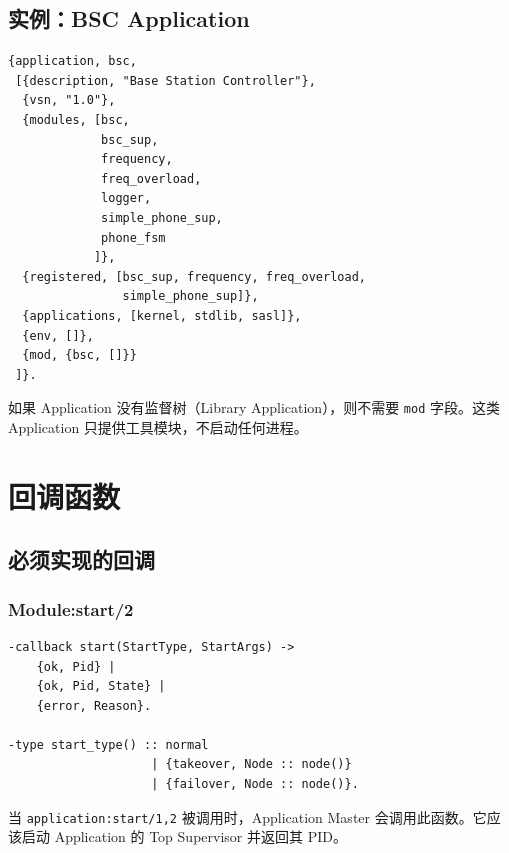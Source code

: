 \documentclass[a4paper,11pt]{article}
\begin{document}
\subsection{实例：BSC Application}

\begin{lstlisting}[style=erlangstyle, caption={bsc.app --- 基站控制器 Application 资源文件}]
{application, bsc,
 [{description, "Base Station Controller"},
  {vsn, "1.0"},
  {modules, [bsc,
             bsc_sup,
             frequency,
             freq_overload,
             logger,
             simple_phone_sup,
             phone_fsm
            ]},
  {registered, [bsc_sup, frequency, freq_overload,
                simple_phone_sup]},
  {applications, [kernel, stdlib, sasl]},
  {env, []},
  {mod, {bsc, []}}
 ]}.
\end{lstlisting}

\begin{notebox}
如果 Application 没有监督树（Library Application），则不需要 \texttt{mod} 字段。这类 Application 只提供工具模块，不启动任何进程。
\end{notebox}


\section{回调函数}

\subsection{必须实现的回调}

\subsubsection{Module:start/2}

\begin{lstlisting}[style=erlangstyle]
-callback start(StartType, StartArgs) ->
    {ok, Pid} |
    {ok, Pid, State} |
    {error, Reason}.

-type start_type() :: normal
                    | {takeover, Node :: node()}
                    | {failover, Node :: node()}.
\end{lstlisting}

当 \texttt{application:start/1,2} 被调用时，Application Master 会调用此函数。它应该启动 Application 的 Top Supervisor 并返回其 PID。
\end{document}
